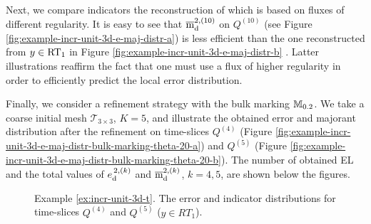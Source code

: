 \begin{example}
Next, we compare indicators the reconstruction of which is based on fluxes of different regularity. 
It is easy to see that $\overline{\mathrm m}^{2, ({10})}_{\mathrm{d}}$ on $Q^{(10)}$ 
(see Figure \ref{fig:example-incr-unit-3d-e-maj-distr-a}) is less efficient than the one
reconstructed from $y \in {\rm RT}_{1}$ in 
Figure \ref{fig:example-incr-unit-3d-e-maj-distr-b} . 
Latter illustrations reaffirm the fact that one must use a 
flux of higher regularity in order to efficiently predict the local error distribution. 

Finally, we consider a refinement strategy with the bulk marking ${\mathbb M}_{0.2}$. We take 
a coarse initial mesh $\mathcal{T}_{3 \times 3}$, $K = 5$, and illustrate the obtained error and 
majorant distribution after the refinement on time-slices $Q^{(4)}$ 
(Figure \ref{fig:example-incr-unit-3d-e-maj-distr-bulk-marking-theta-20-a})
and $Q^{(5)}$ (Figure \ref{fig:example-incr-unit-3d-e-maj-distr-bulk-marking-theta-20-b}).
The number of obtained EL and the total values of ${e}^{\,2, ({k})}_{\mathrm{d}}$ and $\overline{\mathrm m}^{2, ({k})}_{\mathrm{d}}$, 
$k = 4, 5$, are 
shown below the figures. 
%
\begin{figure}[!ht]
	\centering
	\caption{Example \ref{ex:incr-unit-3d-t}. The error and indicator distributions for time-slices $Q^{(4)}$ and $Q^{(5)}$ ($y \in {RT}_1$).}
\end{figure}
%

\end{example}
